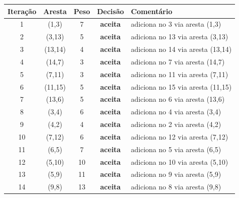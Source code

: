 \begin{footnotesize}
\begin{longtable}{c c c c p{5.5cm}}
\toprule
Itera\c{c}\~ao & Aresta & Peso & Decis\~ao & Coment\'ario \\
\midrule
\endhead
1 & (1,3) & 7 & \textbf{aceita} & adiciona no 3 via aresta (1,3) \\
2 & (3,13) & 5 & \textbf{aceita} & adiciona no 13 via aresta (3,13) \\
3 & (13,14) & 4 & \textbf{aceita} & adiciona no 14 via aresta (13,14) \\
4 & (14,7) & 3 & \textbf{aceita} & adiciona no 7 via aresta (14,7) \\
5 & (7,11) & 3 & \textbf{aceita} & adiciona no 11 via aresta (7,11) \\
6 & (11,15) & 5 & \textbf{aceita} & adiciona no 15 via aresta (11,15) \\
7 & (13,6) & 5 & \textbf{aceita} & adiciona no 6 via aresta (13,6) \\
8 & (3,4) & 6 & \textbf{aceita} & adiciona no 4 via aresta (3,4) \\
9 & (4,2) & 4 & \textbf{aceita} & adiciona no 2 via aresta (4,2) \\
10 & (7,12) & 6 & \textbf{aceita} & adiciona no 12 via aresta (7,12) \\
11 & (6,5) & 7 & \textbf{aceita} & adiciona no 5 via aresta (6,5) \\
12 & (5,10) & 10 & \textbf{aceita} & adiciona no 10 via aresta (5,10) \\
13 & (5,9) & 11 & \textbf{aceita} & adiciona no 9 via aresta (5,9) \\
14 & (9,8) & 13 & \textbf{aceita} & adiciona no 8 via aresta (9,8) \\
\bottomrule
\end{longtable}
\end{footnotesize}
